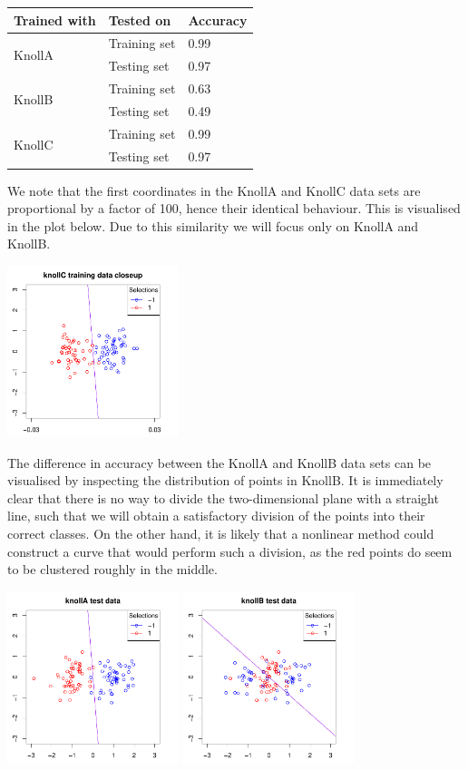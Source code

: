 \documentclass[a4paper, oneside, final]{memoir}
\begin{document}
\begin{tabular}{|l|l|l|}
  \textbf{Trained with} & \textbf{Tested on} & \textbf{Accuracy} \\\hline
  \multirow{2}{*}{KnollA} & Training set & 0.99 \\
  & Testing set & 0.97 \\\hline
  \multirow{2}{*}{KnollB} & Training set & 0.63 \\
  & Testing set & 0.49 \\\hline
  \multirow{2}{*}{KnollC} & Training set & 0.99 \\
  & Testing set & 0.97 \\\hline
\end{tabular}

We note that the first coordinates in the KnollA and KnollC data sets
are proportional by a factor of 100, hence their identical behaviour.
This is visualised in the plot below.  Due to this similarity we will
focus only on KnollA and KnollB.

\includegraphics[width=5cm]{img/question2-plot-c-close.pdf}

The difference in accuracy between the KnollA and KnollB data sets can
be visualised by inspecting the distribution of points in KnollB.  It
is immediately clear that there is no way to divide the
two-dimensional plane with a straight line, such that we will obtain a
satisfactory division of the points into their correct classes.  On
the other hand, it is likely that a nonlinear method could construct a
curve that would perform such a division, as the red points do seem to
be clustered roughly in the middle.

\includegraphics[width=5cm]{img/question2-plot-test-a.pdf}
\includegraphics[width=5cm]{img/question2-plot-test-b.pdf}


%


\end{document}
